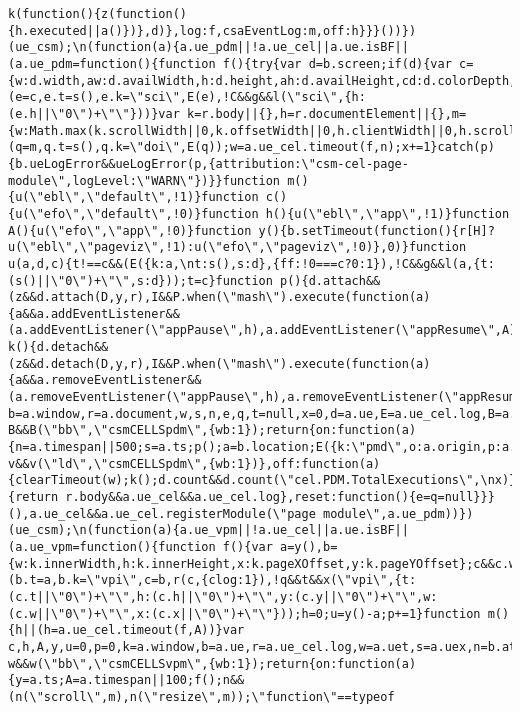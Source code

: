 \documentclass[
]{article}
\begin{document}
\begin{verbatim}
k(function(){z(function(){h.executed||a()})},d)},log:f,csaEventLog:m,off:h}}}())})(ue_csm);\n(function(a){a.ue_pdm||!a.ue_cel||a.ue.isBF||(a.ue_pdm=function(){function f(){try{var d=b.screen;if(d){var c={w:d.width,aw:d.availWidth,h:d.height,ah:d.availHeight,cd:d.colorDepth,pd:d.pixelDepth};e&&e.w===c.w&&e.h===c.h&&e.aw===c.aw&&e.ah===c.ah&&e.pd===c.pd&&e.cd===c.cd||(e=c,e.t=s(),e.k=\"sci\",E(e),!C&&g&&l(\"sci\",{h:(e.h||\"0\")+\"\"}))}var k=r.body||{},h=r.documentElement||{},m={w:Math.max(k.scrollWidth||0,k.offsetWidth||0,h.clientWidth||0,h.scrollWidth||0,h.offsetWidth||0),h:Math.max(k.scrollHeight||\n0,k.offsetHeight||0,h.clientHeight||0,h.scrollHeight||0,h.offsetHeight||0)};q&&q.w===m.w&&q.h===m.h||(q=m,q.t=s(),q.k=\"doi\",E(q));w=a.ue_cel.timeout(f,n);x+=1}catch(p){b.ueLogError&&ueLogError(p,{attribution:\"csm-cel-page-module\",logLevel:\"WARN\"})}}function m(){u(\"ebl\",\"default\",!1)}function c(){u(\"efo\",\"default\",!0)}function h(){u(\"ebl\",\"app\",!1)}function A(){u(\"efo\",\"app\",!0)}function y(){b.setTimeout(function(){r[H]?u(\"ebl\",\"pageviz\",!1):u(\"efo\",\"pageviz\",!0)},0)}function u(a,d,c){t!==c&&(E({k:a,\nt:s(),s:d},{ff:!0===c?0:1}),!C&&g&&l(a,{t:(s()||\"0\")+\"\",s:d}));t=c}function p(){d.attach&&(z&&d.attach(D,y,r),I&&P.when(\"mash\").execute(function(a){a&&a.addEventListener&&(a.addEventListener(\"appPause\",h),a.addEventListener(\"appResume\",A))}),d.attach(\"blur\",m,b),d.attach(\"focus\",c,b))}function k(){d.detach&&(z&&d.detach(D,y,r),I&&P.when(\"mash\").execute(function(a){a&&a.removeEventListener&&(a.removeEventListener(\"appPause\",h),a.removeEventListener(\"appResume\",A))}),d.detach(\"blur\",m,b),d.detach(\"focus\",\nc,b))}var b=a.window,r=a.document,w,s,n,e,q,t=null,x=0,d=a.ue,E=a.ue_cel.log,B=a.uet,v=a.uex,C=a.ue_cel_lclia,g=b.csa,l=a.ue_cel.csaEventLog,z=!!d.pageViz,D=z&&d.pageViz.event,H=z&&d.pageViz.propHid,I=b.P&&b.P.when;\"function\"==typeof B&&B(\"bb\",\"csmCELLSpdm\",{wb:1});return{on:function(a){n=a.timespan||500;s=a.ts;p();a=b.location;E({k:\"pmd\",o:a.origin,p:a.pathname,t:s()});f();\"function\"==typeof v&&v(\"ld\",\"csmCELLSpdm\",{wb:1})},off:function(a){clearTimeout(w);k();d.count&&d.count(\"cel.PDM.TotalExecutions\",\nx)},ready:function(){return r.body&&a.ue_cel&&a.ue_cel.log},reset:function(){e=q=null}}}(),a.ue_cel&&a.ue_cel.registerModule(\"page module\",a.ue_pdm))})(ue_csm);\n(function(a){a.ue_vpm||!a.ue_cel||a.ue.isBF||(a.ue_vpm=function(){function f(){var a=y(),b={w:k.innerWidth,h:k.innerHeight,x:k.pageXOffset,y:k.pageYOffset};c&&c.w==b.w&&c.h==b.h&&c.x==b.x&&c.y==b.y||(b.t=a,b.k=\"vpi\",c=b,r(c,{clog:1}),!q&&t&&x(\"vpi\",{t:(c.t||\"0\")+\"\",h:(c.h||\"0\")+\"\",y:(c.y||\"0\")+\"\",w:(c.w||\"0\")+\"\",x:(c.x||\"0\")+\"\"}));h=0;u=y()-a;p+=1}function m(){h||(h=a.ue_cel.timeout(f,A))}var c,h,A,y,u=0,p=0,k=a.window,b=a.ue,r=a.ue_cel.log,w=a.uet,s=a.uex,n=b.attach,e=b.detach,q=a.ue_cel_lclia,t=\nk.csa,x=a.ue_cel.csaEventLog;\"function\"==typeof w&&w(\"bb\",\"csmCELLSvpm\",{wb:1});return{on:function(a){y=a.ts;A=a.timespan||100;f();n&&(n(\"scroll\",m),n(\"resize\",m));\"function\"==typeof 
\end{verbatim}
\end{document}
